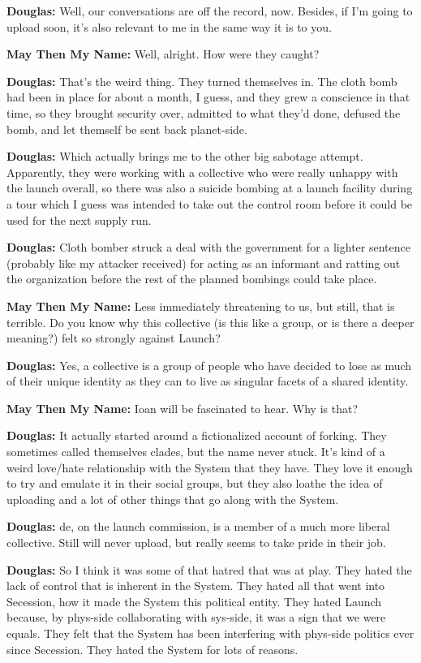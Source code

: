\textbf{Douglas:} Well, our conversations are off the record, now. Besides, if I'm going to upload soon, it's also relevant to me in the same way it is to you.

\textbf{May Then My Name:} Well, alright. How were they caught?

\textbf{Douglas:} That's the weird thing. They turned themselves in. The cloth bomb had been in place for about a month, I guess, and they grew a conscience in that time, so they brought security over, admitted to what they'd done, defused the bomb, and let themself be sent back planet-side.

\textbf{Douglas:} Which actually brings me to the other big sabotage attempt. Apparently, they were working with a collective who were really unhappy with the launch overall, so there was also a suicide bombing at a launch facility during a tour which I guess was intended to take out the control room before it could be used for the next supply run.

\textbf{Douglas:} Cloth bomber struck a deal with the government for a lighter sentence (probably like my attacker received) for acting as an informant and ratting out the organization before the rest of the planned bombings could take place.

\textbf{May Then My Name:} Less immediately threatening to us, but still, that is terrible. Do you know why this collective (is this like a group, or is there a deeper meaning?) felt so strongly against Launch?

\textbf{Douglas:} Yes, a collective is a group of people who have decided to lose as much of their unique identity as they can to live as singular facets of a shared identity.

\textbf{May Then My Name:} Ioan will be fascinated to hear. Why is that?

\textbf{Douglas:} It actually started around a fictionalized account of forking. They sometimes called themselves clades, but the name never stuck. It's kind of a weird love/hate relationship with the System that they have. They love it enough to try and emulate it in their social groups, but they also loathe the idea of uploading and a lot of other things that go along with the System.

\textbf{Douglas:} de, on the launch commission, is a member of a much more liberal collective. Still will never upload, but really seems to take pride in their job.

\textbf{Douglas:} So I think it was some of that hatred that was at play. They hated the lack of control that is inherent in the System. They hated all that went into Secession, how it made the System this political entity. They hated Launch because, by phys-side collaborating with sys-side, it was a sign that we were equals. They felt that the System has been interfering with phys-side politics ever since Secession. They hated the System for lots of reasons.

